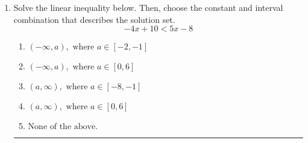 \documentclass[14pt]{extbook}
\newcommand{\litem}[1]{\item#1\hspace*{-1cm}\rule{\textwidth}{0.4pt}}
\begin{document}
\begin{enumerate}
{\begin{enumerate}[label=\Alph*.]
\end{enumerate} }
\litem{
Solve the linear inequality below. Then, choose the constant and interval combination that describes the solution set.\[ -4x + 10 < 5x -8 \]\begin{enumerate}[label=\Alph*.]
\item \( (-\infty, a), \text{ where } a \in [-2, -1] \)
\item \( (-\infty, a), \text{ where } a \in [0, 6] \)
\item \( (a, \infty), \text{ where } a \in [-8, -1] \)
\item \( (a, \infty), \text{ where } a \in [0, 6] \)
\item \( \text{None of the above}. \)

\end{enumerate} }
\end{enumerate}
\end{document}
